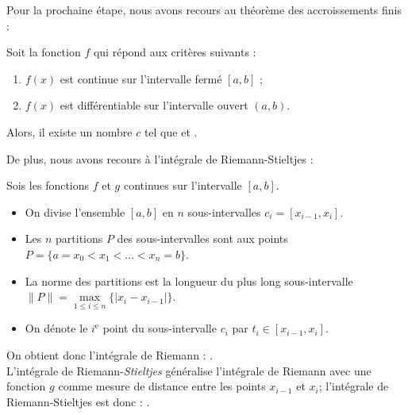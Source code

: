 \documentclass[10pt, french]{article}
\begin{document}
\begin{multicols*}{2}
Pour la prochaine étape, nous avons recours au théorème des accroissements finis :
\begin{rappel_enhanced}
Soit la fonction $f$ qui répond aux critères suivants :
\begin{enumerate}
	\item	$f(x)$ est continue sur l'intervalle fermé $[a, b]$ ;
	\item	$f(x)$ est différentiable sur l'intervalle ouvert $(a, b)$.
\end{enumerate}

Alors, il existe un nombre $c$ tel que  et .
\end{rappel_enhanced}

De plus, nous avons recours à l'intégrale de Riemann-Stieltjes :

\begin{rappel_enhanced}
Sois les fonctions $f$ et $g$ continues sur l'intervalle $[a, b]$.
\begin{itemize}
	\item	On divise l'ensemble $[a, b]$ en $n$ sous-intervalles $c_{i} = [x_{i - 1}, x_{i}]$.
	\item	Les $n$ partitions $P$ des sous-intervalles sont aux points $P	=	\{a	=	x_{0} < x_{1} < \hdots < x_{n} = b\}$. 
	\item	La norme des partitions est la longueur du plus long sous-intervalle $\lVert P \rVert	=	\underset{1 \leq i \leq n}{\max}\{|x_{i} - x_{i - 1}|\}$.
	\item	On dénote le $i^{\text{e}}$ point du sous-intervalle $c_{i}$ par $t_{i} \in [x_{i - 1}, x_{i}]$.
\end{itemize}

On obtient donc l'intégrale de Riemann : .\\

L'intégrale de Riemann-\textit{Stieltjes} généralise l'intégrale de Riemann avec une fonction $g$ comme mesure de distance entre les points $x_{i - 1}$ et $x_{i}$; l'intégrale de Riemann-Stieltjes est donc : .
\end{rappel_enhanced}



\end{multicols*}
\end{document}
